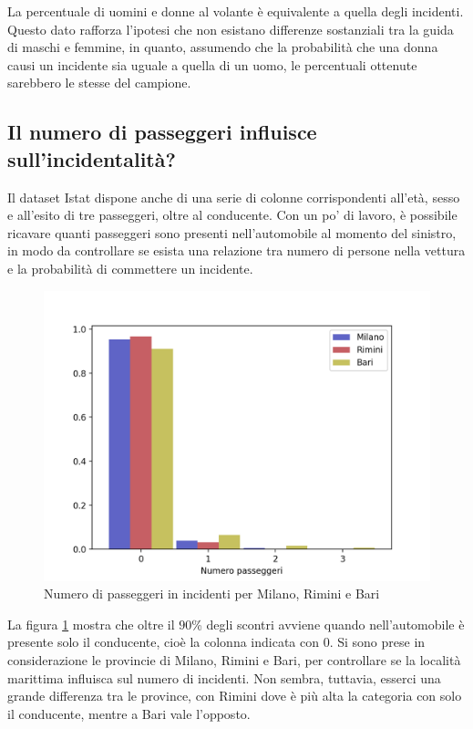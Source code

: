 \documentclass[a4paper,12pt]{report}
\begin{document}
La percentuale di uomini e donne al volante è equivalente a quella degli incidenti.
Questo dato rafforza l'ipotesi che non esistano differenze sostanziali tra la guida di 
maschi e femmine, in quanto, assumendo che la probabilità che una donna causi un 
incidente sia uguale a quella di un uomo, le percentuali ottenute sarebbero 
le stesse del campione.

\subsection{Il numero di passeggeri influisce sull'incidentalità?}

Il dataset Istat dispone anche di una serie di colonne corrispondenti all'età, sesso e 
all'esito di tre passeggeri, oltre al conducente.
Con un po' di lavoro, è possibile ricavare quanti passeggeri sono presenti 
nell'automobile al momento del sinistro, in modo da controllare se esista una 
relazione tra numero di persone nella vettura e la probabilità di commettere un incidente.

\begin{figure}
    \includegraphics[width=\linewidth]{../src/incidenti/incidenti_senza_coords/passeggeri/passeggeri.png}
    \caption{Numero di passeggeri in incidenti per Milano, Rimini e Bari}
    \label{fig:passeggeri-milano-rimini}
\end{figure}

La figura \ref{fig:passeggeri-milano-rimini} mostra che oltre il $90$\% degli scontri
avviene quando nell'automobile è presente solo il conducente, 
cioè la colonna indicata con 0.
Si sono prese in considerazione le provincie di Milano, Rimini e Bari, 
per controllare se la località marittima influisca sul numero di incidenti.
Non sembra, tuttavia, esserci una grande differenza tra le province, con Rimini dove è 
più alta la categoria con solo il conducente, mentre a Bari vale l'opposto.
\end{document}
